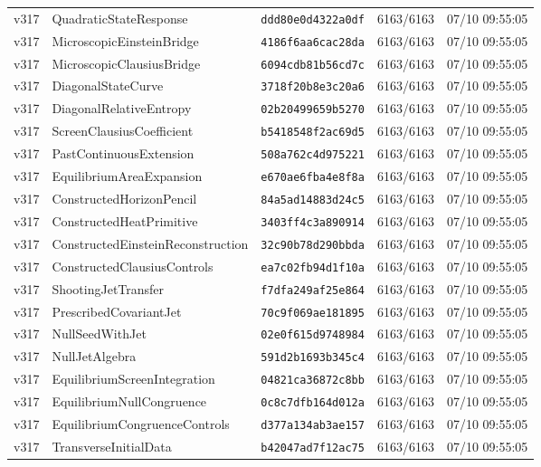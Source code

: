 \documentclass[11pt]{article}
\theoremstyle{definition}\newtheorem{deriv}{Derivação}
\begin{document}
{\begin{longtable}{@{}lllll@{}}
v317 & QuadraticStateResponse & \texttt{ddd80e0d4322a0df} & 6163/6163 & 07/10 09:55:05 \\
v317 & MicroscopicEinsteinBridge & \texttt{4186f6aa6cac28da} & 6163/6163 & 07/10 09:55:05 \\
v317 & MicroscopicClausiusBridge & \texttt{6094cdb81b56cd7c} & 6163/6163 & 07/10 09:55:05 \\
v317 & DiagonalStateCurve & \texttt{3718f20b8e3c20a6} & 6163/6163 & 07/10 09:55:05 \\
v317 & DiagonalRelativeEntropy & \texttt{02b20499659b5270} & 6163/6163 & 07/10 09:55:05 \\
v317 & ScreenClausiusCoefficient & \texttt{b5418548f2ac69d5} & 6163/6163 & 07/10 09:55:05 \\
v317 & PastContinuousExtension & \texttt{508a762c4d975221} & 6163/6163 & 07/10 09:55:05 \\
v317 & EquilibriumAreaExpansion & \texttt{e670ae6fba4e8f8a} & 6163/6163 & 07/10 09:55:05 \\
v317 & ConstructedHorizonPencil & \texttt{84a5ad14883d24c5} & 6163/6163 & 07/10 09:55:05 \\
v317 & ConstructedHeatPrimitive & \texttt{3403ff4c3a890914} & 6163/6163 & 07/10 09:55:05 \\
v317 & ConstructedEinsteinReconstruction & \texttt{32c90b78d290bbda} & 6163/6163 & 07/10 09:55:05 \\
v317 & ConstructedClausiusControls & \texttt{ea7c02fb94d1f10a} & 6163/6163 & 07/10 09:55:05 \\
v317 & ShootingJetTransfer & \texttt{f7dfa249af25e864} & 6163/6163 & 07/10 09:55:05 \\
v317 & PrescribedCovariantJet & \texttt{70c9f069ae181895} & 6163/6163 & 07/10 09:55:05 \\
v317 & NullSeedWithJet & \texttt{02e0f615d9748984} & 6163/6163 & 07/10 09:55:05 \\
v317 & NullJetAlgebra & \texttt{591d2b1693b345c4} & 6163/6163 & 07/10 09:55:05 \\
v317 & EquilibriumScreenIntegration & \texttt{04821ca36872c8bb} & 6163/6163 & 07/10 09:55:05 \\
v317 & EquilibriumNullCongruence & \texttt{0c8c7dfb164d012a} & 6163/6163 & 07/10 09:55:05 \\
v317 & EquilibriumCongruenceControls & \texttt{d377a134ab3ae157} & 6163/6163 & 07/10 09:55:05 \\
v317 & TransverseInitialData & \texttt{b42047ad7f12ac75} & 6163/6163 & 07/10 09:55:05 \\

\end{longtable}}
\end{document}
